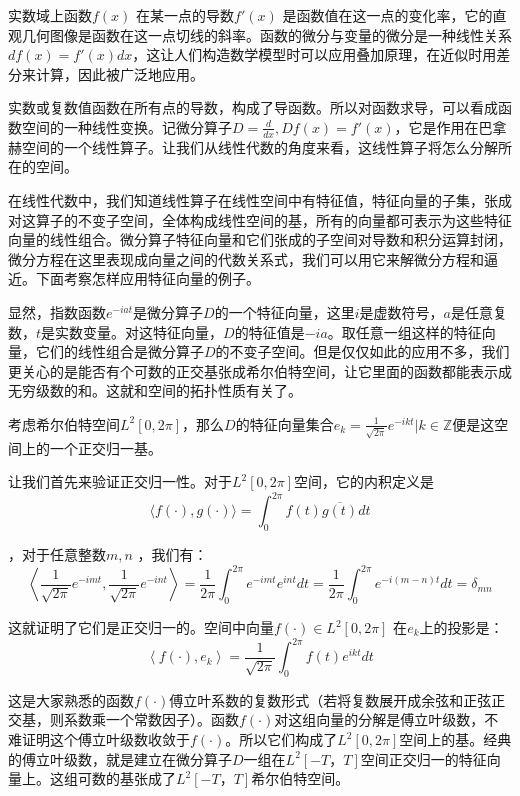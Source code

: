 实数域上函数$ f(x) $ 在某一点的导数$ f′(x) $ 是函数值在这一点的变化率，它的直观几何图像是函数在这一点切线的斜率。函数的微分与变量的微分是一种线性关系$ df(x)=f′(x)dx $，这让人们构造数学模型时可以应用叠加原理，在近似时用差分来计算，因此被广泛地应用。

实数或复数值函数在所有点的导数，构成了导函数。所以对函数求导，可以看成函数空间的一种线性变换。记微分算子$ D=\frac{d}{dx},Df(x)=f′(x) $，它是作用在巴拿赫空间的一个线性算子。让我们从线性代数的角度来看，这线性算子将怎么分解所在的空间。

在线性代数中，我们知道线性算子在线性空间中有特征值，特征向量的子集，张成对这算子的不变子空间，全体构成线性空间的基，所有的向量都可表示为这些特征向量的线性组合。微分算子特征向量和它们张成的子空间对导数和积分运算封闭，微分方程在这里表现成向量之间的代数关系式，我们可以用它来解微分方程和逼近。下面考察怎样应用特征向量的例子。

显然，指数函数$ e^{−iat} $是微分算子$ D $的一个特征向量，这里$ i $是虚数符号，$ a $是任意复数，$ t $是实数变量。对这特征向量，$ D $的特征值是$ -ia $。取任意一组这样的特征向量，它们的线性组合是微分算子$ D $的不变子空间。但是仅仅如此的应用不多，我们更关心的是能否有个可数的正交基张成希尔伯特空间，让它里面的函数都能表示成无穷级数的和。这就和空间的拓扑性质有关了。

考虑希尔伯特空间$ L^2[0,2π] $，那么$ D $的特征向量集合$ {e_k=\frac{1}{\sqrt{2\pi}}e^{−ikt}|k\in \mathbb{Z}} $便是这空间上的一个正交归一基。

让我们首先来验证正交归一性。对于$ L^2[0, 2π] $空间，它的内积定义是
\begin{equation*}
	\langle f(\cdot),g(\cdot)\rangle = \int_{0}^{2\pi}f(t)\overline{g(t)}dt 
\end{equation*}
	
，对于任意整数$ m,n $ ，我们有：
\begin{equation}
	\left \langle \frac{1}{\sqrt{2\pi}}e^{-imt},\frac{1}{\sqrt{2\pi}}e^{-int}\right \rangle =\frac{1}{2\pi}\int_0^{2\pi}e^{-imt}e^{int}dt =\frac{1}{2\pi}\int_0^{2\pi}e^{-i(m-n)t}dt = \delta_{mn}
\end{equation}

这就证明了它们是正交归一的。空间中向量$ f(\cdot)\in L^2[0,2\pi] $ 在$ e_k $上的投影是：
\begin{equation}
	\left \langle f(\cdot),e_k \right \rangle = \frac{1}{\sqrt{2\pi}}\int_0^{2\pi}f(t)e^{ikt}dt
\end{equation}

这是大家熟悉的函数$  f(\cdot) $傅立叶系数的复数形式（若将复数展开成余弦和正弦正交基，则系数乘一个常数因子）。函数$  f(\cdot) $对这组向量的分解是傅立叶级数，不难证明这个傅立叶级数收敛于$  f(\cdot) $。所以它们构成了$ L^2[0, 2π] $空间上的基。经典的傅立叶级数，就是建立在微分算子$ D $一组在$ L^2[-T，T] $空间正交归一的特征向量上。这组可数的基张成了$ L^2[-T，T] $希尔伯特空间。

